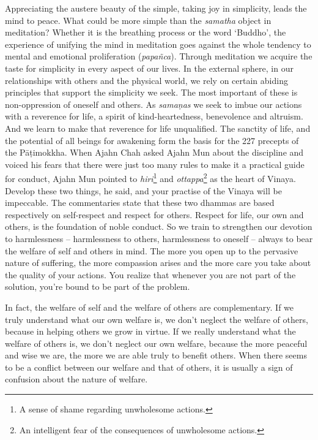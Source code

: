 Appreciating the austere beauty of the simple, taking joy in simplicity, 
leads the mind to peace. What could be more simple than the
\emph{samatha} object in meditation? Whether it is the breathing process
or the word `Buddho', the experience of unifying the mind in meditation
goes against the whole tendency to mental and emotional proliferation
 (\emph{papañca}). Through meditation we acquire the taste for simplicity
in every aspect of our lives. In the external sphere, in our
relationships with others and the physical world, we rely on certain
abiding principles that support the simplicity we seek. The most
important of these is non-oppression of oneself and others. As
\emph{samaṇas} we seek to imbue our actions with a reverence for life, a
spirit of kind-heartedness, benevolence and altruism. And we learn to
make that reverence for life unqualified. The sanctity of life, and the
potential of all beings for awakening form the basis for the 227
precepts of the Pāṭimokkha. When Ajahn Chah asked Ajahn Mun about the
discipline and voiced his fears that there were just too many rules to
make it a practical guide for conduct, Ajahn Mun pointed to
\emph{hiri}\footnote{A sense of shame regarding unwholesome
actions.} and \emph{ottappa}\footnote{An intelligent fear of
the consequences of unwholesome actions.} as the heart of Vinaya. 
Develop these two things, he said, and your practise of the Vinaya will
be impeccable. The commentaries state that these two dhammas are based
respectively on self-respect and respect for others. Respect for life, 
our own and others, is the foundation of noble conduct. So we train to
strengthen our devotion to harmlessness -- harmlessness to others, 
harmlessness to oneself -- always to bear the welfare of self and
others in mind. The more you open up to the pervasive nature of
suffering, the more compassion arises and the more care you take about
the quality of your actions. You realize that whenever you are not part
of the solution, you're bound to be part of the problem. 

In fact, the welfare of self and the welfare of others are
complementary. If we truly understand what our own welfare is, we don't
neglect the welfare of others, because in helping others we grow in
virtue. If we really understand what the welfare of others is, we don't
neglect our own welfare, because the more peaceful and wise we are, the
more we are able truly to benefit others. When there seems to be a
conflict between our welfare and that of others, it is usually a sign of
confusion about the nature of welfare. 

